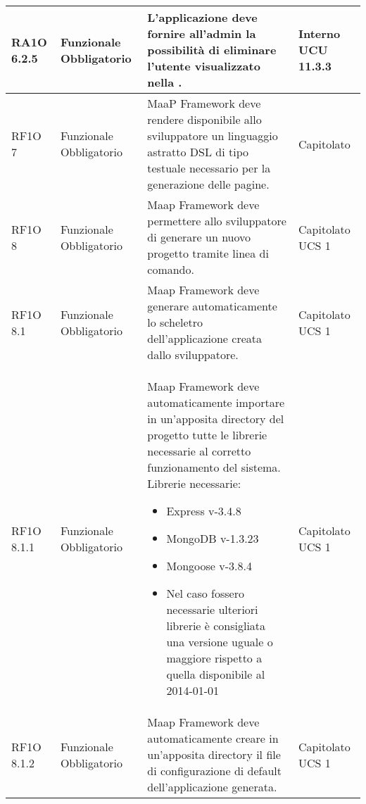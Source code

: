 \begin{center}
\begin{longtable}{ | l | p{2cm} | p{5cm} | p{1.7cm} |}
				RA1O 6.2.5 & Funzionale \newline  Obbligatorio  & L'applicazione deve fornire all'admin la possibilità di eliminare l'utente visualizzato nella \glossario{show-page}. &  Interno \newline  UCU 11.3.3 \newline  \\ \hline      
				RF1O 7 & Funzionale \newline  Obbligatorio  & MaaP Framework deve rendere disponibile allo sviluppatore un linguaggio astratto DSL di tipo testuale necessario per la generazione delle pagine. &  Capitolato \newline  \\ \hline      
				RF1O 8 & Funzionale \newline  Obbligatorio  & Maap Framework deve permettere allo sviluppatore di generare un nuovo progetto tramite linea di comando. &  Capitolato \newline  UCS 1 \newline  \\ \hline      
				RF1O 8.1  & Funzionale \newline  Obbligatorio  & Maap Framework deve generare automaticamente lo scheletro dell’applicazione creata dallo sviluppatore. &  Capitolato \newline  UCS 1 \newline  \\ \hline      
				RF1O 8.1.1 & Funzionale \newline  Obbligatorio  & Maap Framework deve automaticamente importare in un'apposita directory del progetto tutte le librerie necessarie al corretto funzionamento del sistema. Librerie necessarie: \begin{itemize} \item Express v-3.4.8 \item MongoDB v-1.3.23 \item Mongoose v-3.8.4 \item Nel caso fossero necessarie ulteriori librerie è consigliata una versione uguale o maggiore rispetto a quella disponibile al 2014-01-01 \end{itemize} &  Capitolato \newline  UCS 1 \newline  \\ \hline      
				RF1O 8.1.2 & Funzionale \newline  Obbligatorio  & Maap Framework deve automaticamente creare in un’apposita directory il file di configurazione di default dell’applicazione generata. &  Capitolato \newline  UCS 1 \newline  \\ \hline      

\end{longtable}
\end{center}
